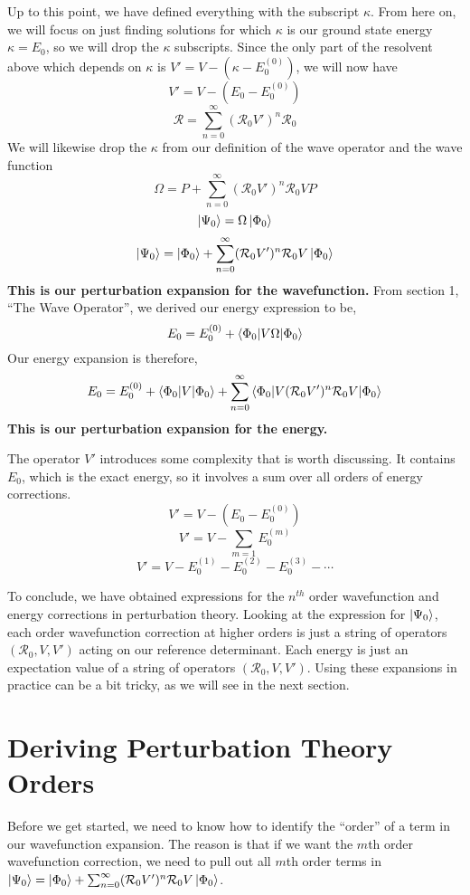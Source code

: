\documentclass{article}
\newcommand{\Ezero}{E^{(0)}}
\newcommand{\Rz}{\mathcal{R}_{0}}
\begin{document}
Up to this point, we have defined everything with the subscript $\kappa$.
From here on, we will focus on just finding solutions for which $\kappa$ is our ground 
state energy $\kappa = E_0$, so we will drop the $\kappa$ subscripts.
Since the only part of the resolvent above which depends on $\kappa$ is 
$V' = V - (\kappa - \Ezero_0)$, we will now have 
\[V' = V - (E_0 - \Ezero_0)\]
\[\mathcal{R} = \sum_{n=0}^{\infty} (\Rz V')^n \Rz \]
We will likewise drop the $\kappa$ from our definition of the wave operator 
and the wave function
\[\Omega = P + \sum_{n=0}^{\infty} (\Rz V')^n \Rz V P \]
\[\ket{\Psi_0} = \Omega \ket{\Phi_0}\]
\[\ket{\Psi_0} =  \ket{\Phi_0} + \sum_{n=0}^{\infty} (\Rz V')^n \Rz V \ket{\Phi_0} \]
\textbf{This is our perturbation expansion for the wavefunction.}
From section 1, ``The Wave Operator'', we derived our energy expression to be, 
\[ E_0 = \Ezero_0 + \braket{\Phi_0 | V \Omega | \Phi_0}  \]
Our energy expansion is therefore,
\[E_0 = \Ezero_0 + \braket{\Phi_0|V|\Phi_0} + \sum_{n=0}^{\infty} \braket{\Phi_0|V (\Rz V')^n \Rz V | \Phi_0}\]
\textbf{This is our perturbation expansion for the energy.}

The operator $V'$ introduces some complexity that is worth discussing. 
It contains $E_0$, which is the exact energy, 
    so it involves a sum over all orders of energy corrections.
\[V' = V - (E_0 - \Ezero_0) \]
\[V' = V - \sum_{m=1} E_0^{(m)} \]
\[V' = V - E_0^{(1)} - E_0^{(2)} - E_0^{(3)} - \cdots \]

To conclude, we have obtained expressions for the $n^{th}$ order wavefunction 
and energy corrections in perturbation theory.
Looking at the expression for $\ket{\Psi_0}$, each order wavefunction correction
at higher orders is just a string of operators $(\Rz, V, V')$ acting on our reference determinant.
Each energy is just an expectation value of a string of operators $(\Rz, V, V')$.
Using these expansions in practice can be a bit tricky, as we will see in the next section.

\section{Deriving Perturbation Theory Orders}
Before we get started, we need to know how to identify the ``order'' of a term in our
wavefunction expansion. The reason is that if we want the 
$m$th order wavefunction correction, we need to pull out all $m$th order
terms in $\ket{\Psi_0} =  \ket{\Phi_0} + \sum_{n=0}^{\infty} (\Rz V')^n \Rz V \ket{\Phi_0}$.
\end{document}
